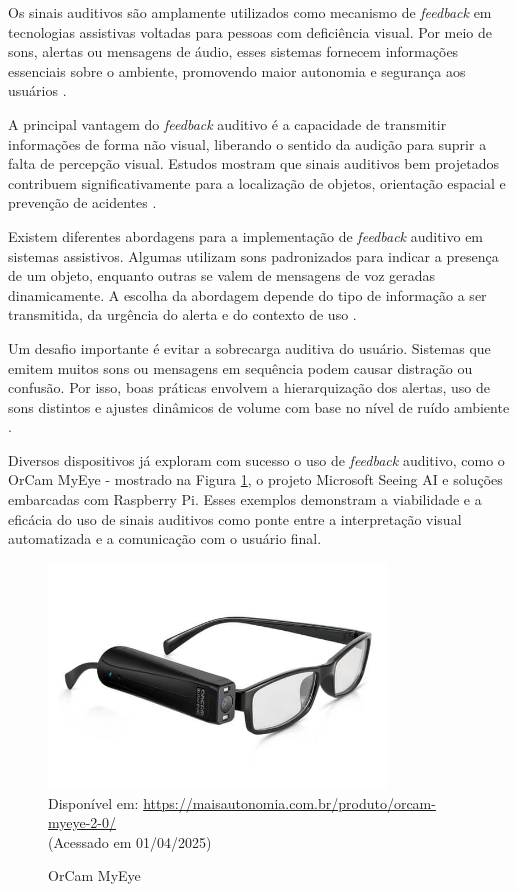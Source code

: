 Os sinais auditivos são amplamente utilizados como mecanismo de \textit{feedback} em tecnologias assistivas voltadas para pessoas com deficiência visual. Por meio de sons, alertas ou mensagens de áudio, esses sistemas fornecem informações essenciais sobre o ambiente, promovendo maior autonomia e segurança aos usuários \cite{Milella2014}.

A principal vantagem do \textit{feedback} auditivo é a capacidade de transmitir informações de forma não visual, liberando o sentido da audição para suprir a falta de percepção visual. Estudos mostram que sinais auditivos bem projetados contribuem significativamente para a localização de objetos, orientação espacial e prevenção de acidentes \cite{Nguyen2020-feedback_strategies}.

Existem diferentes abordagens para a implementação de \textit{feedback} auditivo em sistemas assistivos. Algumas utilizam sons padronizados para indicar a presença de um objeto, enquanto outras se valem de mensagens de voz geradas dinamicamente. A escolha da abordagem depende do tipo de informação a ser transmitida, da urgência do alerta e do contexto de uso \cite{Spagnol2018}.

Um desafio importante é evitar a sobrecarga auditiva do usuário. Sistemas que emitem muitos sons ou mensagens em sequência podem causar distração ou confusão. Por isso, boas práticas envolvem a hierarquização dos alertas, uso de sons distintos e ajustes dinâmicos de volume com base no nível de ruído ambiente \cite{Akbar2022}.

Diversos dispositivos já exploram com sucesso o uso de \textit{feedback} auditivo, como o OrCam MyEye - mostrado na Figura \ref{fg-orcammyeye}, o projeto Microsoft Seeing AI e soluções embarcadas com Raspberry Pi. Esses exemplos demonstram a viabilidade e a eficácia do uso de sinais auditivos como ponte entre a interpretação visual automatizada e a comunicação com o usuário final.

\begin{figure}[htbp]
  \centering
  \caption{OrCam MyEye}
  \includegraphics[width=0.8\textwidth]{Figuras/orcammyeye.jpg}
  \\
  Disponível em: \url{https://maisautonomia.com.br/produto/orcam-myeye-2-0/} \\(Acessado em 01/04/2025)
  \label{fg-orcammyeye}
\end{figure}

